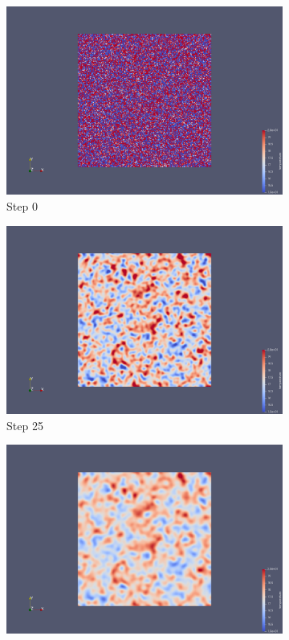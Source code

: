 \documentclass[a4paper,12pt]{article}
\begin{document}
 \begin{figure}
\centering
\begin{subfigure}{0.4\textwidth}
    \includegraphics[width=\textwidth]{../images/vtk/bonus/temp/step_0.png}
    \caption{Step 0}
\end{subfigure}
\hfill
\begin{subfigure}{0.4\textwidth}
    \includegraphics[width=\textwidth]{../images/vtk/bonus/temp/step_25.png}
    \caption{Step 25}
\end{subfigure}
\hfill
\begin{subfigure}{0.4\textwidth}
    \includegraphics[width=\textwidth]{../images/vtk/bonus/temp/step_50.png}

\end{subfigure}
\end{figure}
\end{document}
